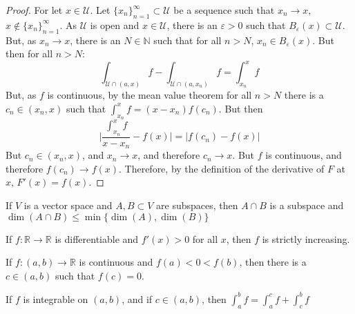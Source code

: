 \documentclass[crop=false,class=book,oneside]{standalone}
\begin{document}
        \begin{proof}
            For let $x\in\mathcal{U}$. Let
            $\{x_n\}_{n=1}^{\infty}\subset\mathcal{U}$
            be a sequence such that $x_{n}\rightarrow x$,
            $x\notin\{x_{n}\}_{n=1}^{\infty}$.
            As $\mathcal{U}$ is open and $x\in\mathcal{U}$,
            there is an $\varepsilon>0$ such that
            $B_{\varepsilon}(x)\subset\mathcal{U}$. But, as
            $x_{n}\rightarrow x$, there is an $N\in \mathbb{N}$ such
            that for all $n>N$, $x_{n}\in B_{\varepsilon}(x)$.
            But then for all $n>N$:
            \begin{equation*}
                \int_{\mathcal{U}\cap(a,x)}f-%
                \int_{\mathcal{U}\cap(a,x_{n})}f=%
                \int_{x_{n}}^{x}f
            \end{equation*}
            But, as $f$ is continuous, by the mean value theorem for
            all $n>N$ there is a $c_{n}\in(x_n,x)$ such that
            $\int_{x_{n}}^{x}f=(x-x_{n})f(c_{n})$. But then 
            \begin{equation*}
                \Big|\frac{\int_{x_{n}}^{x}f}{x-x_{n}}-f(x)\Big|
                =|f(c_{n})-f(x)|
            \end{equation*}
            But $c_{n}\in(x_{n},x)$, and $x_{n}\rightarrow x$, and
            therefore $c_{n} \rightarrow x$. But $f$ is continuous,
            and therefore $f(c_{n})\rightarrow f(x)$. Therefore, by
            the definition of the derivative of $F$ at $x$,
            $F'(x)=f(x)$. 
        \end{proof}
        \begin{theorem*}
            If $V$ is a vector space and $A,B\subset V$ are
            subspaces, then $A\cap B$ is a subspace and
            $\dim(A\cap B)\leq\min\{\dim(A),\dim(B)\}$
        \end{theorem*}
        \begin{theorem*}
            If $f:\mathbb{R}\rightarrow \mathbb{R}$
            is differentiable
            and $f'(x)>0$ for all $x$,
            then $f$ is strictly increasing.
        \end{theorem*}
        \begin{theorem*}
            If $f:(a,b)\rightarrow\mathbb{R}$ is continuous and
            $f(a)<0<f(b)$, then there is a $c\in (a,b)$ such that
            $f(c)=0$.
        \end{theorem*}
        \begin{theorem*}
            If $f$ is integrable on $(a,b)$, and if $c\in(a,b)$, then
            $\int_{a}^{b}f=\int_{a}^{c}f+\int_{c}^{b}f$
        \end{theorem*}
\end{document}
